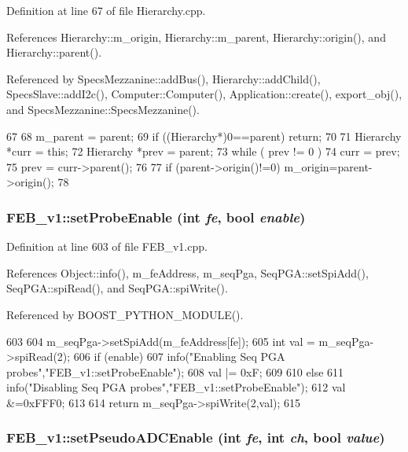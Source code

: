 Definition at line 67 of file Hierarchy.cpp.

References Hierarchy::m\_\-origin, Hierarchy::m\_\-parent, Hierarchy::origin(), and Hierarchy::parent().

Referenced by SpecsMezzanine::addBus(), Hierarchy::addChild(), SpecsSlave::addI2c(), Computer::Computer(), Application::create(), export\_\-obj(), and SpecsMezzanine::SpecsMezzanine().


\begin{DoxyCode}
67                                               {
68   m_parent = parent;
69   if ((Hierarchy*)0==parent) return;
70 
71   Hierarchy *curr = this;
72   Hierarchy *prev = parent;
73   while ( prev != 0 ){
74     curr = prev;
75     prev = curr->parent();
76   }
77   if (parent->origin()!=0) m_origin=parent->origin();
78 }
\end{DoxyCode}
\hypertarget{classFEB__v1_abb013a3441c02f57cea07a244554fdd5}{
\subsubsection[{setProbeEnable}]{ FEB\_\-v1::setProbeEnable (int {\em fe}, \/  bool {\em enable})}}
\label{classFEB__v1_abb013a3441c02f57cea07a244554fdd5}


Definition at line 603 of file FEB\_\-v1.cpp.

References Object::info(), m\_\-feAddress, m\_\-seqPga, SeqPGA::setSpiAdd(), SeqPGA::spiRead(), and SeqPGA::spiWrite().

Referenced by BOOST\_\-PYTHON\_\-MODULE().


\begin{DoxyCode}
603                                                      {
604   m_seqPga->setSpiAdd(m_feAddress[fe]);
605   int val = m_seqPga->spiRead(2);
606   if (enable) {
607     info("Enabling Seq PGA probes","FEB_v1::setProbeEnable");
608     val |= 0xF;
609   }
610   else {
611     info("Disabling Seq PGA probes","FEB_v1::setProbeEnable");
612     val &=0xFFF0;
613   }
614   return m_seqPga->spiWrite(2,val);
615 }
\end{DoxyCode}
\hypertarget{classFEB__v1_a244c472d16ea6778cf6ec93943a060a5}{
\subsubsection[{setPseudoADCEnable}]{ FEB\_\-v1::setPseudoADCEnable (int {\em fe}, \/  int {\em ch}, \/  bool {\em value})}}
\label{classFEB__v1_a244c472d16ea6778cf6ec93943a060a5}



